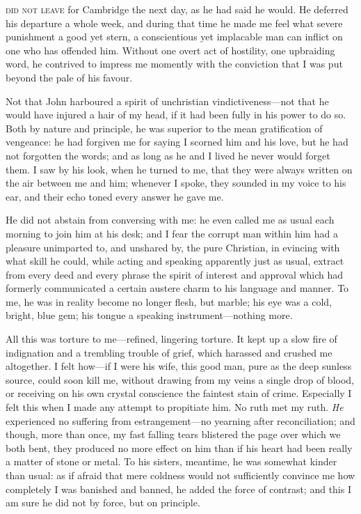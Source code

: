 
 \textsc{did not leave} for Cambridge the next day, as he had said he would.
He deferred his departure a whole week, and during that time he made me
feel what severe punishment a good yet stern, a conscientious yet
implacable man can inflict on one who has offended him. Without one
overt act of hostility, one upbraiding word, he contrived to impress me
momently with the conviction that I was put beyond the pale of his
favour.

Not that \St{} John harboured a spirit of unchristian vindictiveness---not
that he would have injured a hair of my head, if it had been fully in
his power to do so. Both by nature and principle, he was superior to
the mean gratification of vengeance: he had forgiven me for saying I
scorned him and his love, but he had not forgotten the words; and as
long as he and I lived he never would forget them. I saw by his look,
when he turned to me, that they were always written on the air between
me and him; whenever I spoke, they sounded in my voice to his ear, and
their echo toned every answer he gave me.

He did not abstain from conversing with me: he even called me as usual
each morning to join him at his desk; and I fear the corrupt man within
him had a pleasure unimparted to, and unshared by, the pure Christian,
in evincing with what skill he could, while acting and speaking
apparently just as usual, extract from every deed and every phrase the
spirit of interest and approval which had formerly communicated a
certain austere charm to his language and manner. To me, he was in
reality become no longer flesh, but marble; his eye was a cold, bright,
blue gem; his tongue a speaking instrument---nothing more.

All this was torture to me---refined, lingering torture. It kept up a
slow fire of indignation and a trembling trouble of grief, which
harassed and crushed me altogether. I felt how---if I were his wife,
this good man, pure as the deep sunless source, could soon kill me,
without drawing from my veins a single drop of blood, or receiving on
his own crystal conscience the faintest stain of crime. Especially I
felt this when I made any attempt to propitiate him. No ruth met my
ruth. \emph{He} experienced no suffering from estrangement---no
yearning after reconciliation; and though, more than once, my fast
falling tears blistered the page over which we both bent, they produced
no more effect on him than if his heart had been really a matter of
stone or metal. To his sisters, meantime, he was somewhat kinder than
usual: as if afraid that mere coldness would not sufficiently convince
me how completely I was banished and banned, he added the force of
contrast; and this I am sure he did not by force, but on principle.

